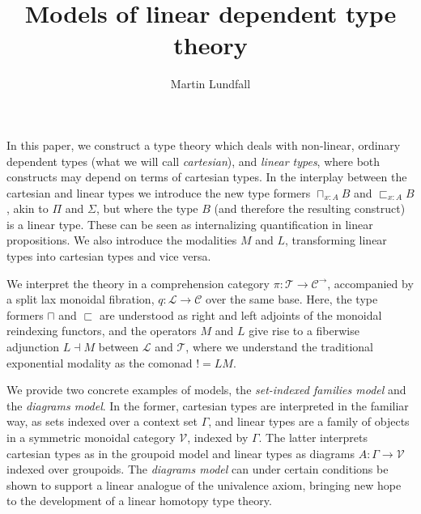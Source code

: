 
\usepackage[margin=0.5in]{geometry}
\usepackage{todonotes}
\newtheorem{lemm}[thm]{Lemma}
\newtheorem{remrk}[thm]{Remark}
\newtheorem{corl}[thm]{Corollary}
\newtheorem{expl}[thm]{Example}
\newtheorem{hyp}[thm]{Hypothesis}

\title{Models of linear dependent type theory}
\author{Martin Lundfall}
\maketitle
\begin{comment}
  Dependent types section
  Enriched cats section
\end{comment}
\abstract
In this paper, we construct a type theory which deals with non-linear, ordinary dependent types (what we will call \textit{cartesian}), and \textit{linear types}, where both constructs may depend on terms of cartesian types. In the interplay between the cartesian and linear types we introduce the new type formers $\sqcap_{x : A}B$ and $\sqsubset_{x : A}B$, akin to $\Pi$ and $\Sigma$, but where the type $B$ (and therefore the resulting construct) is a linear type. These can be seen as internalizing quantification in linear propositions. We also introduce the modalities $M$ and $L$, transforming linear types into cartesian types and vice versa.

We interpret the theory in a comprehension category $\pi : \mathcal{T} \to \mathcal{C}^\to$, accompanied by a split lax monoidal fibration, $q : \mathcal{L} \to \mathcal{C}$ over the same base. Here, the type formers $\sqcap$ and $\sqsubset$ are understood as right and left adjoints of the monoidal reindexing functors, and the operators $M$ and $L$ give rise to a fiberwise adjunction $L \dashv M$ between $\mathcal{L}$ and $\mathcal{T}$, where we understand the traditional exponential modality as the comonad $! = LM$.

We provide two concrete examples of models, the \textit{set-indexed families model} and the \textit{diagrams model}. In the former, cartesian types are interpreted in the familiar way, as sets indexed over a context set $\Gamma$, and linear types are a family of objects in a symmetric monoidal category $\mathcal{V}$, indexed by $\Gamma$. The latter interprets cartesian types as in the groupoid model and linear types as diagrams $A : \Gamma \to \mathcal{V}$ indexed over groupoids. The \textit{diagrams model} can under certain conditions be shown to support a linear analogue of the univalence axiom, bringing new hope to the development of a linear homotopy type theory.
\newpage
\tableofcontents
\newpage
